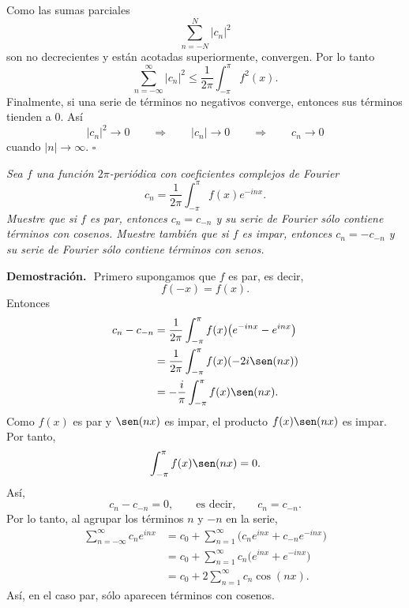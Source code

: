 \documentclass[11pt,letterpaper]{article}
\begin{document}
Como las sumas parciales
\begin{equation*}
    \sum_{n=-N}^{N}|c_n|^2
\end{equation*}
son no decrecientes y están acotadas superiormente, convergen. Por lo tanto
\begin{equation*}
    \sum_{n=-\infty}^{\infty}|c_n|^2
    \leq \frac{1}{2\pi}\int_{-\pi}^{\pi}f^2(x).
\end{equation*}
Finalmente, si una serie de términos no negativos converge, entonces sus términos tienden a $0$. Así
\begin{equation*}
    |c_n|^2\to0
    \qquad\Longrightarrow\qquad
    |c_n|\to0
    \qquad\Longrightarrow\qquad
    c_n\to0
\end{equation*}
cuando $|n|\to\infty$.
\hfill $\square$
\begin{tcolorbox}[title=\textcolor{white}{Problema 4}]
\textit{Sea $f$ una función $2\pi$-periódica con coeficientes complejos de Fourier}
\begin{equation*}
    c_n=\frac{1}{2\pi}\int_{-\pi}^{\pi}f(x)e^{-inx}.
\end{equation*}
\textit{Muestre que si $f$ es par, entonces $c_n=c_{-n}$ y su serie de Fourier sólo contiene términos con cosenos. Muestre también que si $f$ es impar, entonces $c_n=-c_{-n}$ y su serie de Fourier sólo contiene términos con senos.}
\end{tcolorbox}

\textbf{Demostración.}\,\
Primero supongamos que $f$ es par, es decir,
\begin{equation*}
    f(-x)=f(x).
\end{equation*}
Entonces
\begin{align*}
    c_n-c_{-n}
    &=\frac{1}{2\pi}\int_{-\pi}^{\pi}f(x)\bigl(e^{-inx}-e^{inx}\bigr)\\
    &=\frac{1}{2\pi}\int_{-\pi}^{\pi}f(x)(-2i\sen(nx))\\
    &=-\frac{i}{\pi}\int_{-\pi}^{\pi}f(x)\sen(nx).
\end{align*}
Como $f(x)$ es par y $\sen(nx)$ es impar, el producto $f(x)\sen(nx)$ es impar. Por tanto,
\begin{equation*}
    \int_{-\pi}^{\pi}f(x)\sen(nx)=0.
\end{equation*}
Así,
\begin{equation*}
    c_n-c_{-n}=0,
    \qquad \text{es decir,}\qquad c_n=c_{-n}.
\end{equation*}
Por lo tanto, al agrupar los términos $n$ y $-n$ en la serie,
\begin{align*}
    \sum_{n=-\infty}^{\infty}c_ne^{inx}
    &=c_0+\sum_{n=1}^{\infty}\bigl(c_ne^{inx}+c_{-n}e^{-inx}\bigr) \\
    &=c_0+\sum_{n=1}^{\infty}c_n\bigl(e^{inx}+e^{-inx}\bigr) \\
    &=c_0+2\sum_{n=1}^{\infty}c_n\cos(nx).
\end{align*}
Así, en el caso par, sólo aparecen términos con cosenos.
\end{document}
